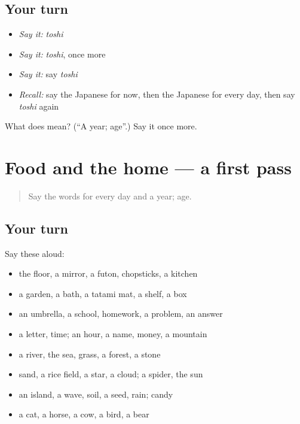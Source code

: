 \subsection*{Your turn}
\begin{itemize}
\raggedright
  \item \emph{Say it:} \emph{toshi}
  \item \emph{Say it:} \emph{toshi}, once more
  \item \emph{Say it:} say \emph{toshi}
  \item \emph{Recall:} say the Japanese for now, then the Japanese for every day, then say \emph{toshi} again
\end{itemize}

\begin{tcolorbox}[breakable,colback=teal!4,colframe=teal!35!black,title={Before you move on}]
What does  mean? (\textquotedblleft{}A year; age\textquotedblright{}.) Say it once more.
\end{tcolorbox}
\section[(dialogue)]{Food and the home — a first pass}

\label{lesson:JA-R54-first-pass-food-and-the-home}



\begin{quote}
Say the words for every day and a year; age.
\end{quote}

\subsection*{Your turn}
Say these aloud:

\begin{itemize}
\raggedright
  \item the floor, a mirror, a futon, chopsticks, a kitchen
  \item a garden, a bath, a tatami mat, a shelf, a box
  \item an umbrella, a school, homework, a problem, an answer
  \item a letter, time; an hour, a name, money, a mountain
  \item a river, the sea, grass, a forest, a stone
  \item sand, a rice field, a star, a cloud; a spider, the sun
  \item an island, a wave, soil, a seed, rain; candy
  \item a cat, a horse, a cow, a bird, a bear
\end{itemize}

